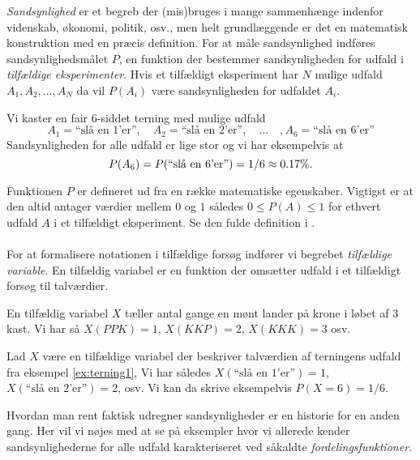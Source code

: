\emph{Sandsynlighed} er et begreb der (mis)bruges i mange sammenhænge indenfor videnskab, økonomi, politik, osv., men helt grundlæggende er det en matematisk konstruktion med en præcis definition. For at måle sandsynlighed indføres sandsynlighedsmålet $P$, en funktion der bestemmer sandsynligheden for udfald i \emph{tilfældige eksperimenter}. Hvis et tilfældigt eksperiment har $N$ mulige udfald $A_1, A_2,\dots, A_N$ da vil $P(A_i)$ være sandsynligheden for udfaldet $A_i$.
\begin{example} \label{ex:terning1}
Vi kaster en fair 6-siddet terning med mulige udfald 
$$A_1 = \text{``slå en 1'er''}, \quad  A_2 = \text{``slå en 2'er''}, \quad \dots \quad, A_6 = \text{``slå en 6'er''}$$
Sandsynligheden for alle udfald er lige stor og vi har eksempelvis at \\
$$P(A_6) = P(``\text{slå en 6'er''}) = 1/6 \approx 0.17\%.$$
\end{example}
Funktionen $P$ er defineret ud fra en række matematiske egenskaber. Vigtigst er at den altid antager værdier mellem $0$ og $1$ således $0 \leq P(A) \leq 1$ for ethvert udfald $A$ i et tilfældigt eksperiment. Se den fulde definition i \cite[sektion 1.3]{olofsson2012}. 
\\ \\
For at formalisere notationen i tilfældige forsøg indfører vi begrebet \emph{tilfældige variable}. En tilfældig variabel er en funktion der omsætter udfald i et tilfældigt forsøg til talværdier.
\begin{example}
En tilfældig variabel $X$ tæller antal gange en mønt lander på krone i løbet af $3$ kast. Vi har så $X(PPK) = 1$, $X(KKP) = 2$, $X(KKK) = 3$ osv.
\end{example}
\begin{example} \label{ex:terning2} Lad $X$ være en tilfældige variabel der beskriver talværdien af terningens udfald fra eksempel \ref{ex:terning1}, Vi har således $X(\text{``slå en 1'er''}) = 1$, $X(\text{``slå en 2'er''}) = 2$, osv. Vi kan da skrive eksempelvis $P(X = 6) = 1/6$.
\end{example}
Hvordan man rent faktisk udregner sandsynligheder er en historie for en anden gang. Her vil vi nøjes med at se på eksempler hvor vi allerede kender sandsynlighederne for alle udfald karakteriseret ved såkaldte \textit{fordelingsfunktioner}. 